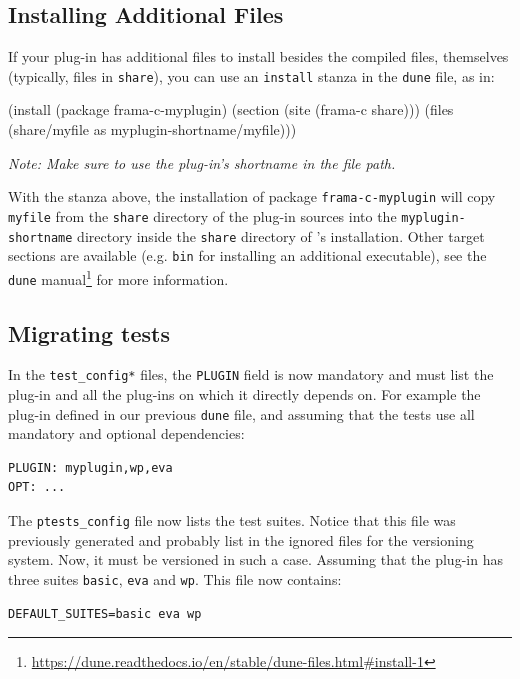 \subsection{Installing Additional Files}

If your plug-in has additional files to install besides the compiled files,
themselves (typically, files in \texttt{share}), you can use an
\texttt{install} stanza in the \texttt{dune} file, as in:

\begin{dunecode}
(install
  (package frama-c-myplugin)
  (section (site (frama-c share)))
  (files (share/myfile as myplugin-shortname/myfile)))
\end{dunecode}

{\em Note: Make sure to use the plug-in's shortname in the file path.}

With the stanza above, the installation of package \texttt{frama-c-myplugin}
will copy \texttt{myfile} from the \texttt{share} directory
of the plug-in sources into the \texttt{myplugin-shortname} directory inside
the \texttt{share} directory of \framac's installation. Other target sections
are available (e.g. \texttt{bin} for installing an additional executable), see
the \texttt{dune}
manual\footnote{\url{https://dune.readthedocs.io/en/stable/dune-files.html\#install-1}}
for more information.

\subsection{Migrating tests}

In the \texttt{test\_config*} files, the \texttt{PLUGIN} field is now mandatory
and must list the plug-in and all the plug-ins on which it directly depends on.
For example the plug-in defined in our previous \texttt{dune} file, and assuming
that the tests use all mandatory and optional dependencies:

\begin{lstlisting}
PLUGIN: myplugin,wp,eva
OPT: ...
\end{lstlisting}

The \texttt{ptests\_config} file now lists the test suites. Notice that this file
was previously generated and probably list in the ignored files for the versioning
system. Now, it must be versioned in such a case. Assuming that the plug-in has
three suites \texttt{basic}, \texttt{eva} and \texttt{wp}. This file now
contains:

\begin{lstlisting}
DEFAULT_SUITES=basic eva wp
\end{lstlisting}

